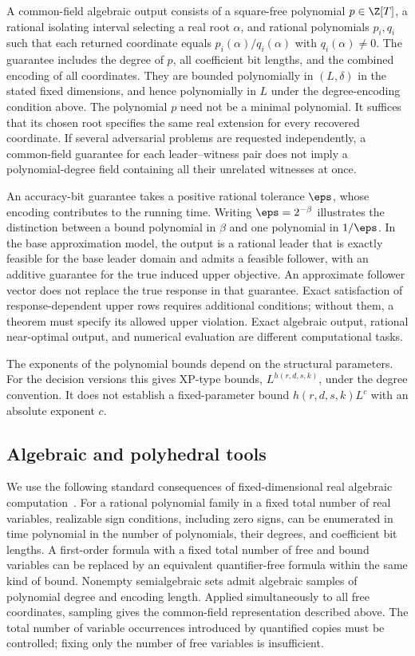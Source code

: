 A common-field algebraic output consists of a square-free polynomial
$p\in\Z[T]$, a rational isolating interval selecting a real root
$\alpha$, and rational polynomials $p_i,q_i$ such that each returned
coordinate equals $p_i(\alpha)/q_i(\alpha)$ with $q_i(\alpha)\ne0$.
The guarantee includes the degree of $p$, all coefficient bit lengths,
and the combined encoding of all coordinates. They are bounded
polynomially in $(L,\delta)$ in the stated fixed dimensions, and hence
polynomially in $L$ under the degree-encoding condition above. The
polynomial $p$ need not be a minimal polynomial. It suffices that its
chosen root specifies the same real extension for every recovered
coordinate. If several adversarial problems are requested independently,
a common-field guarantee for each leader--witness pair does not imply a
polynomial-degree field containing all their unrelated witnesses at once.

An accuracy-bit guarantee takes a positive rational tolerance $\eps$,
whose encoding contributes to the running time. Writing $\eps=2^{-\beta}$
illustrates the distinction between a bound polynomial in $\beta$ and
one polynomial in $1/\eps$. In the base approximation model, the output
is a rational leader that is exactly feasible for the base leader domain
and admits a feasible follower, with an additive guarantee for the true
induced upper objective. An approximate follower vector does not replace
the true response in that guarantee. Exact satisfaction of
response-dependent upper rows requires additional conditions; without
them, a theorem must specify its allowed upper violation. Exact
algebraic output, rational near-optimal output, and numerical evaluation
are different computational tasks.

The exponents of the polynomial bounds depend on the structural
parameters. For the decision versions this gives XP-type bounds,
$L^{h(r,d,s,k)}$, under the degree convention. It does not establish a
fixed-parameter bound $h(r,d,s,k)L^c$ with an absolute exponent $c$.

\subsection{Algebraic and polyhedral tools}\label{subsec:tools}

We use the following standard consequences of fixed-dimensional real
algebraic computation~\cite[Theorem 1.3.1 and Section 3.1.3]{BasuPollackRoy1996}.
For a rational polynomial family in a fixed total number of real
variables, realizable sign conditions, including zero signs, can be
enumerated in time polynomial in the number of polynomials, their degrees,
and coefficient bit lengths. A first-order formula with a fixed total
number of free and bound variables can be replaced by an equivalent
quantifier-free formula within the same kind of bound. Nonempty
semialgebraic sets admit algebraic samples of polynomial degree and
encoding length. Applied simultaneously to all free coordinates, sampling
gives the common-field representation described above. The total number
of variable occurrences introduced by quantified copies must be controlled;
fixing only the number of free variables is insufficient.

